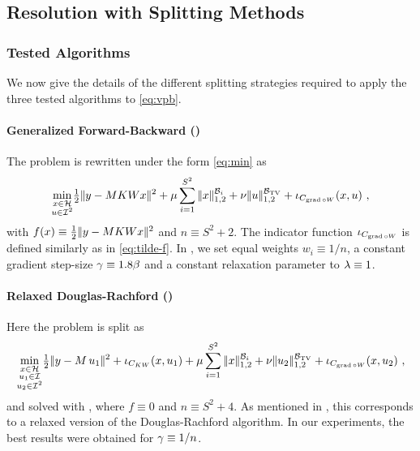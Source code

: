 \subsection{Resolution with Splitting Methods}

	\subsubsection{Tested Algorithms}

We now give the details of the different splitting strategies required to apply the three tested algorithms to \eqref{eq:vpb}.

\paragraph{Generalized Forward-Backward (\GFB)} The problem is rewritten under the form \eqref{eq:min} as
%
\begin{equation}\label{eq:vpb-GFB}
 \umin{\substack{x \in \Hh\\u \in \RG}} \half \norm{y - \Mr \Ks W x}^2 + \musp \sum_{i=1}^{S^2} \normbki{x} + \mutv \normbktv{u} + \iota_{C_{\gradient \circ W}}(x,u) ~,
\end{equation}
%
with $f(x) \equiv {\textstyle \frac{1}{2}} |\kern-1pt| y - M K W x |\kern-1pt|^2$ and $n \equiv S^2 + 2$. The indicator function $\iota_{C_{\operatorname{grad} \circ W}}$ is defined similarly as in \eqref{eq:tilde-f}. In , we set equal weights $w_i \equiv 1/n$, a constant gradient step-size $\gamma \equiv 1.8 \beta$ and a constant relaxation parameter to $\lambda \equiv 1$.

\paragraph{Relaxed Douglas-Rachford (\DR)} Here the problem is split as
%
\begin{equation*}
 \underset{\substack{x \in \mathcal{H}\\u_1 \in \mathcal{I}\\u_2 \in \mathcal{I}^2}}{\min} {\textstyle \frac{1}{2}} |\kern-1pt| y - M \, u_1 |\kern-1pt|^2 + \iota_{C_{K W}}(x,u_1) + \mu \sum_{i=1}^{S^2} |\kern-1pt| x |\kern-1pt|_{1,2}^{\mathcal{B}_i} + \nu |\kern-1pt| u_2 |\kern-1pt|_{1,2}^{\mathcal{B}_{\mathrm{TV}}} + \iota_{C_{\operatorname{grad} \circ W}}(x,u_2) ~,
\end{equation*}
% 
and solved with , where $f \equiv 0$ and $n \equiv S^2 + 4$. As mentioned in , this corresponds to a relaxed version of the Douglas-Rachford algorithm. In our experiments, the best results were obtained for $\gamma \equiv 1/n$.

